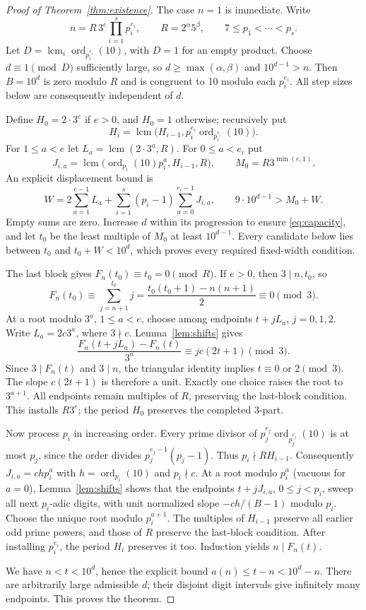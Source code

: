 \begin{proof}[Proof of Theorem~\ref{thm:existence}]
The case $n=1$ is immediate. Write
\[
 n=R\,3^e\prod_{i=1}^s p_i^{e_i},\qquad
 R=2^\alpha5^\beta,\qquad 7\le p_1<\cdots<p_s.
\]
Let $D=\operatorname{lcm}_i\operatorname{ord}_{p_i^{e_i}}(10)$,
with $D=1$ for an empty product. Choose $d\equiv1\pmod D$ sufficiently
large, so $d\ge\max(\alpha,\beta)$ and $10^{d-1}>n$.
Then $B=10^d$ is zero modulo $R$ and is congruent to 10 modulo
each $p_i^{e_i}$. All step sizes below are consequently independent of $d$.

Define $H_0=2\cdot3^e$ if $e>0$, and $H_0=1$ otherwise; recursively put
\[
 H_i=\operatorname{lcm}\bigl(H_{i-1},
       p_i^{e_i}\operatorname{ord}_{p_i^{e_i}}(10)\bigr).
\]
For $1\le a<e$ let $L_a=\operatorname{lcm}(2\cdot3^a,R)$.
For $0\le a<e_i$ put
\[
 J_{i,a}=\operatorname{lcm}
   \bigl(\operatorname{ord}_{p_i}(10)p_i^a,H_{i-1},R\bigr),
 \qquad M_0=R3^{\min(e,1)}.
\]
An explicit displacement bound is
\begin{equation}\label{eq:capacity}
 W=2\sum_{a=1}^{e-1}L_a+
       \sum_{i=1}^s(p_i-1)\sum_{a=0}^{e_i-1}J_{i,a},
 \qquad 9\cdot10^{d-1}>M_0+W.
\end{equation}
Empty sums are zero. Increase $d$ within its progression to ensure
\eqref{eq:capacity}, and let $t_0$ be the least multiple of $M_0$
at least $10^{d-1}$. Every candidate below lies between $t_0$ and
$t_0+W<10^d$, which proves every required fixed-width condition.

The last block gives $F_n(t_0)\equiv t_0=0\pmod R$.
If $e>0$, then $3\mid n,t_0$, so
\[
 F_n(t_0)\equiv\sum_{j=n+1}^{t_0}j
   =\frac{t_0(t_0+1)-n(n+1)}2\equiv0\pmod3.
\]
At a root modulo $3^a$, $1\le a<e$, choose among endpoints
$t+jL_a$, $j=0,1,2$. Write $L_a=2c3^a$, where $3\nmid c$.
Lemma~\ref{lem:shifts} gives
\[
 \frac{F_n(t+jL_a)-F_n(t)}{3^a}
       \equiv jc(2t+1)\pmod3.
\]
Since $3\mid F_n(t)$ and $3\mid n$, the triangular identity implies
$t\equiv0$ or $2\pmod3$. The slope $c(2t+1)$ is therefore a unit.
Exactly one choice raises the root to $3^{a+1}$. All endpoints remain
multiples of $R$, preserving the last-block condition. This installs
$R3^e$; the period $H_0$ preserves the completed 3-part.

Now process $p_i$ in increasing order. Every prime divisor of
$p_j^{e_j}\operatorname{ord}_{p_j^{e_j}}(10)$ is at most $p_j$,
since the order divides $p_j^{e_j-1}(p_j-1)$. Thus $p_i\nmid RH_{i-1}$.
Consequently $J_{i,a}=chp_i^a$ with $h=\operatorname{ord}_{p_i}(10)$
and $p_i\nmid c$. At a root modulo $p_i^a$ (vacuous for $a=0$),
Lemma~\ref{lem:shifts} shows that the endpoints
$t+jJ_{i,a}$, $0\le j<p_i$, sweep all next $p_i$-adic digits,
with unit normalized slope $-ch/(B-1)$ modulo $p_i$.
Choose the unique root modulo $p_i^{a+1}$. The multiples of $H_{i-1}$
preserve all earlier odd prime powers, and those of $R$ preserve
the last-block condition. After installing $p_i^{e_i}$, the period
$H_i$ preserves it too. Induction yields $n\mid F_n(t)$.

We have $n<t<10^d$, hence the explicit bound $a(n)\le t-n<10^d-n$.
There are arbitrarily large admissible $d$; their disjoint digit
intervals give infinitely many endpoints. This proves the theorem.
\end{proof}

